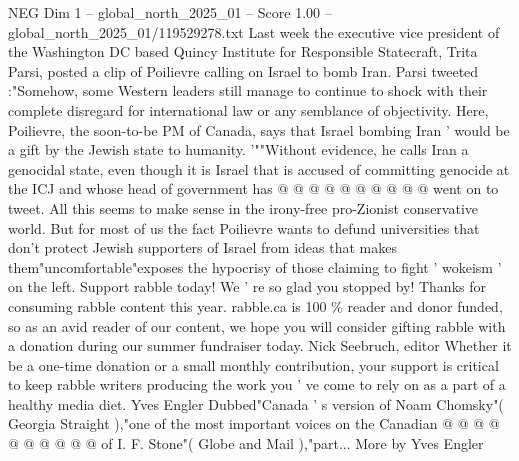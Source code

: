 \begin{textsample}{NEG Dim 1 – global\_north\_2025\_01 – Score 1.00 – global\_north\_2025\_01/119529278.txt}
Last week the executive vice president of the Washington DC based Quincy Institute for Responsible Statecraft, Trita Parsi, posted a clip of Poilievre calling on Israel to bomb Iran.
Parsi tweeted :"Somehow, some Western leaders still manage to continue to shock with their complete disregard for international law or any semblance of objectivity.
Here, Poilievre, the soon-to-be PM of Canada, says that Israel bombing Iran ' would be a gift by the Jewish state to humanity. '""Without evidence, he calls Iran a genocidal state, even though it is Israel that is accused of committing genocide at the ICJ and whose head of government has @ @ @ @ @ @ @ @ @ @ went on to tweet.
All this seems to make sense in the irony-free pro-Zionist conservative world.
But for most of us the fact Poilievre wants to defund universities that don't protect Jewish supporters of Israel from ideas that makes them"uncomfortable"exposes the hypocrisy of those claiming to fight ' wokeism ' on the left.
Support rabble today!
We ' re so glad you stopped by!
Thanks for consuming rabble content this year. rabble.ca is 100 \% reader and donor funded, so as an avid reader of our content, we hope you will consider gifting rabble with a donation during our summer fundraiser today.
Nick Seebruch, editor Whether it be a one-time donation or a small monthly contribution, your support is critical to keep rabble writers producing the work you ' ve come to rely on as a part of a healthy media diet.
Yves Engler Dubbed"Canada ' s version of Noam Chomsky"( Georgia Straight ),"one of the most important voices on the Canadian @ @ @ @ @ @ @ @ @ @ of I.
F.
Stone"( Globe and Mail ),"part...
More by Yves Engler

\end{textsample}
